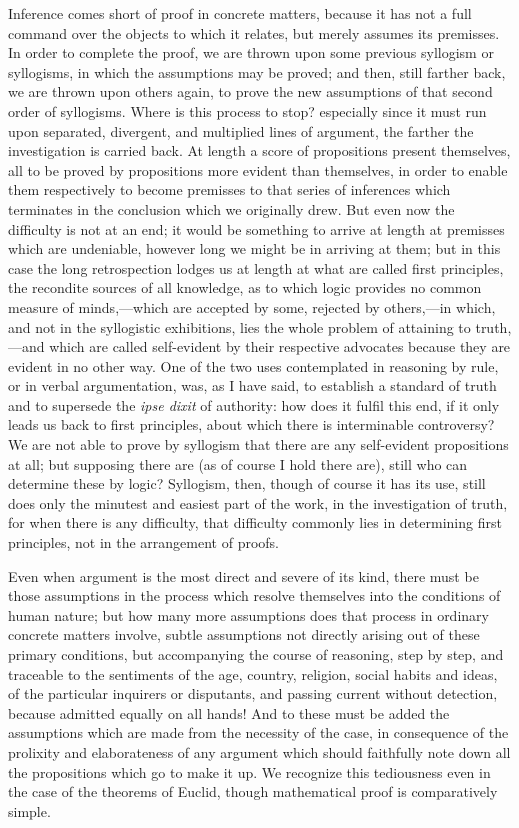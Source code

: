Inference comes short of proof in concrete matters, because it has
not a full command over the objects to which it relates, but merely
assumes its premisses. In order to complete the proof, we are thrown
upon some previous syllogism or syllogisms, in which the assumptions
may be proved; and then, still farther back, we are thrown upon others
again, to prove the new assumptions of that second order of
syllogisms. Where is this process to stop? especially since it must
run upon separated, divergent, and multiplied lines of argument, the
farther the investigation is carried back. At length a score of
propositions present themselves, all to be proved by propositions more
evident than themselves, in order to enable them respectively to
become premisses to that series of inferences which terminates in the
conclusion which we originally drew. But even now the difficulty is
not at an end; it would be something to arrive at length at premisses
which are undeniable, however long we might be in arriving at them;
but in this case the long retrospection lodges us at length at what
are called first principles, the recondite sources of all knowledge,
as to which logic provides no common measure of minds,—which are
accepted by some, rejected by others,—in which, and not in the
syllogistic exhibitions, lies the whole problem of attaining to truth,—and
which are called self-evident by their respective advocates because
they are evident in no other way. One of the two uses
contemplated in reasoning by rule, or in verbal argumentation, was, as
I have said, to establish a standard of truth and to supersede the \emph{ipse
dixit} of authority: how does it fulfil this end, if it only leads
us back to first principles, about which there is interminable
controversy? We are not able to prove by syllogism that there are any
self-evident propositions at all; but supposing there are (as of
course I hold there are), still who can determine these by logic?
Syllogism, then, though of course it has its use, still does only the
minutest and easiest part of the work, in the investigation of truth,
for when there is any difficulty, that difficulty commonly lies in
determining first principles, not in the arrangement of proofs.

Even when argument is the most direct and severe of its kind, there
must be those assumptions in the process which resolve themselves into
the conditions of human nature; but how many more assumptions does
that process in ordinary concrete matters involve, subtle assumptions
not directly arising out of these primary conditions, but accompanying
the course of reasoning, step by step, and traceable to the sentiments
of the age, country, religion, social habits and ideas, of the
particular inquirers or disputants, and passing current without
detection, because admitted equally on all hands! And to these must be
added the assumptions which are made from the necessity of the case,
in consequence of the prolixity and elaborateness of any argument
which should faithfully note down all the propositions which go to
make it up. We recognize this tediousness even in the case of
the theorems of Euclid, though mathematical proof is comparatively
simple.

